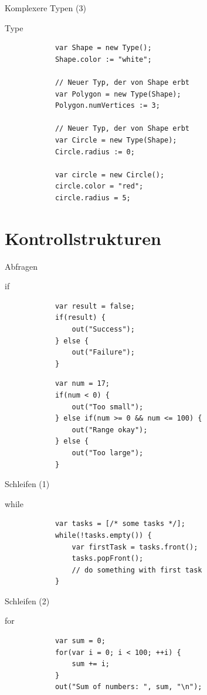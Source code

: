 \documentclass[ucs,9pt]{beamer}
\begin{document}
\begin{frame}[fragile]{Komplexere Typen (3)}
	\begin{block}{Type}
		\begin{lstlisting}
			var Shape = new Type();
			Shape.color := "white";

			// Neuer Typ, der von Shape erbt
			var Polygon = new Type(Shape); 
			Polygon.numVertices := 3;

			// Neuer Typ, der von Shape erbt
			var Circle = new Type(Shape); 
			Circle.radius := 0;

			var circle = new Circle();
			circle.color = "red";
			circle.radius = 5;
		\end{lstlisting}
	\end{block}
\end{frame}
 
\section{Kontrollstrukturen}
\begin{frame}[fragile]{Abfragen}
	\begin{block}{if}
		\begin{lstlisting}
			var result = false;
			if(result) {
			    out("Success");
			} else {
			    out("Failure");
			}
		\end{lstlisting}
		\begin{lstlisting}
			var num = 17;
			if(num < 0) {
			    out("Too small");
			} else if(num >= 0 && num <= 100) {
			    out("Range okay");
			} else {
			    out("Too large");
			}
		\end{lstlisting}
	\end{block}
\end{frame}

\begin{frame}[fragile]{Schleifen (1)}
	\begin{block}{while}
		\begin{lstlisting}
			var tasks = [/* some tasks */];
			while(!tasks.empty()) {
			    var firstTask = tasks.front();
			    tasks.popFront();
			    // do something with first task
			}
		\end{lstlisting}
	\end{block}
\end{frame}

\begin{frame}[fragile]{Schleifen (2)}
	\begin{block}{for}
		\begin{lstlisting}
			var sum = 0;
			for(var i = 0; i < 100; ++i) {
			    sum += i;
			}
			out("Sum of numbers: ", sum, "\n");
		\end{lstlisting}
	\end{block}
\end{frame}
\end{document}
